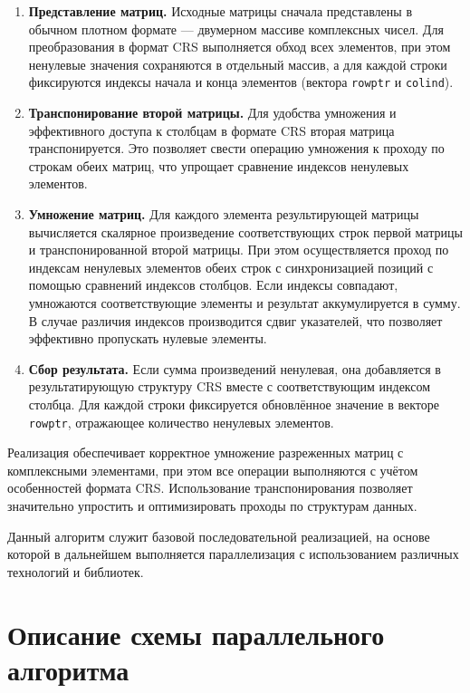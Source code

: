 \documentclass[a4paper,12pt]{article}
\begin{document}
\begin{enumerate}
    \item \textbf{Представление матриц.} Исходные матрицы сначала представлены в обычном плотном формате — двумерном массиве комплексных чисел. Для преобразования в формат CRS выполняется обход всех элементов, при этом ненулевые значения сохраняются в отдельный массив, а для каждой строки фиксируются индексы начала и конца элементов (вектора \texttt{rowptr} и \texttt{colind}).
    
    \item \textbf{Транспонирование второй матрицы.} Для удобства умножения и эффективного доступа к столбцам в формате CRS вторая матрица транспонируется. Это позволяет свести операцию умножения к проходу по строкам обеих матриц, что упрощает сравнение индексов ненулевых элементов.
    
    \item \textbf{Умножение матриц.} Для каждого элемента результирующей матрицы вычисляется скалярное произведение соответствующих строк первой матрицы и транспонированной второй матрицы. При этом осуществляется проход по индексам ненулевых элементов обеих строк с синхронизацией позиций с помощью сравнений индексов столбцов. 
    Если индексы совпадают, умножаются соответствующие элементы и результат аккумулируется в сумму. В случае различия индексов производится сдвиг указателей, что позволяет эффективно пропускать нулевые элементы.
    
    \item \textbf{Сбор результата.} Если сумма произведений ненулевая, она добавляется в результатирующую структуру CRS вместе с соответствующим индексом столбца. Для каждой строки фиксируется обновлённое значение в векторе \texttt{rowptr}, отражающее количество ненулевых элементов.
\end{enumerate}

Реализация обеспечивает корректное умножение разреженных матриц с комплексными элементами, при этом все операции выполняются с учётом особенностей формата CRS. Использование транспонирования позволяет значительно упростить и оптимизировать проходы по структурам данных.

Данный алгоритм служит базовой последовательной реализацией, на основе которой в дальнейшем выполняется параллелизация с использованием различных технологий и библиотек.

\newpage

\section{Описание схемы параллельного алгоритма}
\end{document}
